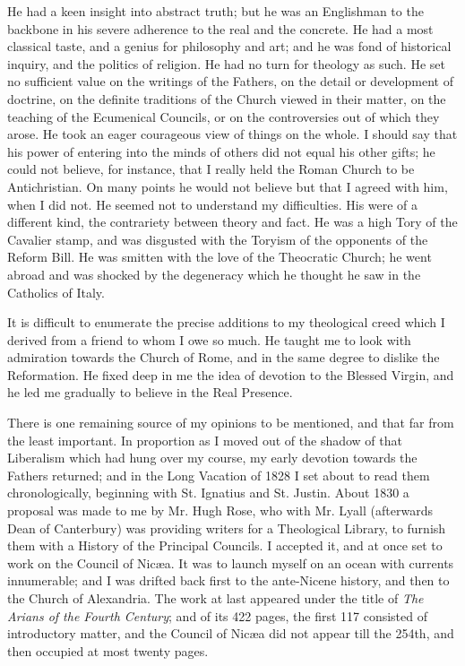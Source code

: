 He had a keen insight into abstract truth; but he was an Englishman
to the backbone in his severe adherence to the real and the concrete.
He had a most classical taste, and a genius for philosophy and art;
and he was fond of historical inquiry, and the politics of religion.
He had no turn for theology as such. He set no sufficient value on the writings of the Fathers,
on the detail or development of doctrine, on the definite traditions of the Church viewed in their matter,
on the teaching of the
Ecumenical Councils, or on
the controversies out of which they arose. He took an eager
courageous view of things on the whole. I should say that his power of
entering into the minds of others did not equal his other gifts; he
could not believe, for instance, that I really held the Roman Church
to be Antichristian. On many points he would not believe but that I
agreed with him, when I did not. He seemed not to understand my
difficulties. His were of a different kind, the contrariety between
theory and fact. He was a high Tory of the Cavalier stamp, and was
disgusted with the Toryism of the opponents of the Reform Bill. He was
smitten with the love of the Theocratic Church; he went abroad and was
shocked by the degeneracy which he thought he saw in the Catholics of
Italy.

It is difficult to enumerate the precise additions to my
theological creed which I derived from a friend to whom I owe so much.
He taught me to look with
admiration towards the Church of Rome, and in the same degree to
dislike the Reformation. He fixed deep in me the idea of
devotion to the Blessed Virgin, and he led me gradually to believe in
the Real Presence.

There is one remaining source of my opinions to be mentioned, and
that far from the least important. In proportion as I moved out of the
shadow of that Liberalism which had hung over my course, my
early devotion towards the Fathers returned; and in the Long Vacation
of 1828 I set about to read them chronologically, beginning with St.
Ignatius and St. Justin. About 1830 a proposal was made to me by Mr.
Hugh Rose, who with Mr. Lyall (afterwards Dean of Canterbury) was
providing writers for a Theological Library, to furnish them with a
History of the Principal Councils. I accepted it, and at once set to
work on the Council of Nicæa. It was to launch myself on an ocean with currents innumerable; and I was
drifted back first to the ante-Nicene history, and then to the Church
of Alexandria. The work at last appeared under the title of \emph{The
Arians of the Fourth Century}; and of its 422 pages, the first
117 consisted of introductory matter, and the Council of Nicæa did
not appear till the 254th, and then occupied at most twenty pages.

